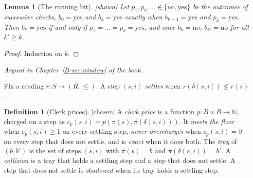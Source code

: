 \documentclass[11pt, a4paper]{article}
\theoremstyle{plain}
\newtheorem{lemma}[theorem]{Lemma}
\theoremstyle{definition}
\newtheorem{definition}[theorem]{Definition}
\theoremstyle{remark}
\newcommand{\N}{\mathbb{N}}
\newcommand{\Bool}{\{\mathrm{no},\mathrm{yes}\}}
\newcommand{\step}{\delta}
\newcommand{\cost}{c}
\newcommand{\rd}{r}
\newcommand{\argued}[1]{\par\noindent\textit{Argued in Chapter~\ref{B-#1} of the book.}\par}
\newcommand{\kind}[1]{\textup{[#1]}}
\begin{document}
\begin{lemma}[The running bit]\label{spec:and-bit} \kind{shown}
Let $p_1,p_2,\dots\in\Bool$ be the outcomes of successive checks, $b_0=\mathrm{yes}$ and
$b_k=\mathrm{yes}$ exactly when $b_{k-1}=\mathrm{yes}$ and $p_k=\mathrm{yes}$. Then $b_k=\mathrm{yes}$ if and
only if $p_1=\dots=p_k=\mathrm{yes}$, and once $b_k=\mathrm{no}$, $b_{k'}=\mathrm{no}$ for all $k'\ge k$.
\end{lemma}
\begin{proof}
Induction on $k$.
\end{proof}
\argued{sec:window}

Fix a reading $\rd:S\to(R,\le)$. A step $(s,i)$ \emph{settles} when $\rd(\step(s,i))\not\le\rd(s)$.

\begin{definition}[Clerk prices]\label{spec:clerk-def} \kind{chosen}
A \emph{clerk price} is a function $p:B\times B\to\N$, charged on a step as
$\cost_p(s,i)=p(\pi(s),\pi(\step(s,i)))$. It \emph{meets the floor} when $\cost_p(s,i)\ge 1$ on every
settling step, \emph{never overcharges} when $\cost_p(s,i)=0$ on every step that does not settle, and is
\emph{exact} when it does both. The \emph{tray} of $(b,b')$ is the set of steps $(s,i)$ with $\pi(s)=b$ and
$\pi(\step(s,i))=b'$. A \emph{collision} is a tray that holds a settling step and a step that does not
settle. A step that does not settle is \emph{shadowed} when its tray holds a settling step.
\end{definition}
\end{document}
